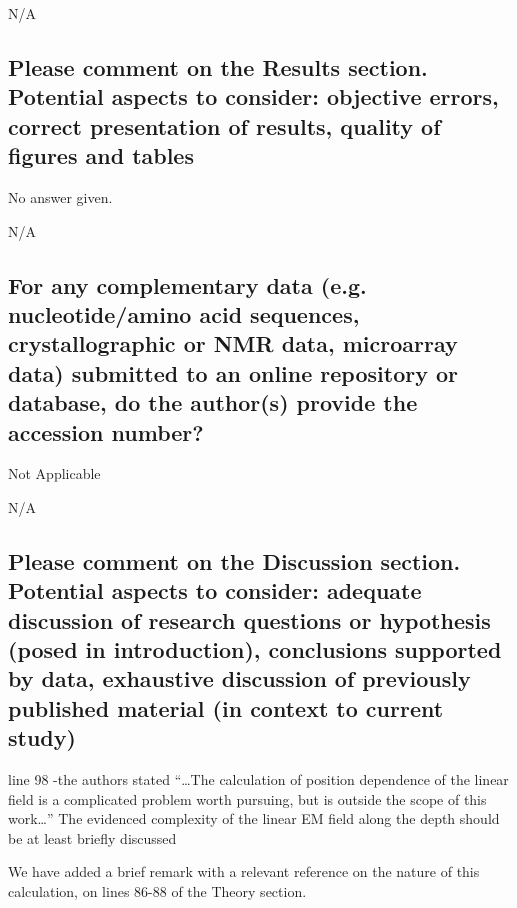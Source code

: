 \documentclass{article}
\begin{document}
\begin{shaded}
N/A
\end{shaded}


\subsection{Please comment on the Results section. Potential aspects to
consider: objective errors, correct presentation of results, quality of figures
and tables}

No answer given.

\begin{shaded}
N/A
\end{shaded}


\subsection{For any complementary data (e.g. nucleotide/amino acid sequences,
crystallographic or NMR data, microarray data) submitted to an online repository
or database, do the author(s) provide the accession number?}

Not Applicable

\begin{shaded}
N/A
\end{shaded}


\subsection{Please comment on the Discussion section. Potential aspects to
consider: adequate discussion of research questions or hypothesis (posed in
introduction), conclusions supported by data, exhaustive discussion of
previously published material (in context to current study)}

line 98 -the authors stated ``\ldots The calculation of position dependence of
the linear field is a complicated problem worth pursuing, but is outside the
scope of this work\ldots'' The evidenced complexity of the linear EM field
along the depth should be at least briefly discussed

\begin{shaded}
We have added a brief remark with a relevant reference on the nature of this calculation, on lines 86-88 of the Theory section.
\end{shaded}
\end{document}
